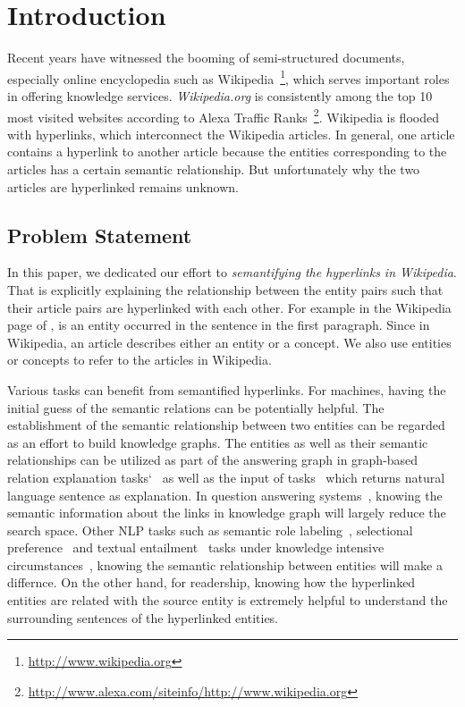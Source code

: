 \section{Introduction}
Recent years have witnessed the booming of semi-structured documents, especially online encyclopedia such as  Wikipedia~\footnote{\small\url{http://www.wikipedia.org}}, which serves important roles in offering knowledge services.
{\it Wikipedia.org} is consistently among the top 10 most visited websites according to Alexa Traffic Ranks~\footnote{\small\url{http://www.alexa.com/siteinfo/http://www.wikipedia.org}}.
Wikipedia is flooded with hyperlinks, which interconnect the Wikipedia articles.
In general, one article contains a hyperlink to another article because the entities corresponding to the articles has a certain semantic relationship.
But unfortunately why the two articles are hyperlinked remains unknown.

\subsection{Problem Statement}
In this paper, we dedicated our effort to {\it semantifying the hyperlinks in Wikipedia}.
That is explicitly explaining the relationship between the entity pairs such that their article pairs are hyperlinked with each other. 
For example in the Wikipedia page of ,  is an entity occurred in the sentence  in the first paragraph.
Since in Wikipedia, an article describes either an entity or a concept. We also use entities or concepts to refer to the articles in Wikipedia. 

Various tasks can benefit from semantified hyperlinks.
For machines, having the initial guess of the semantic relations can be potentially helpful.
The establishment of the semantic relationship between two entities can be regarded as an effort to build knowledge graphs.
The entities as well as their semantic relationships can be utilized as part of the answering graph in graph-based relation explanation tasks`~\cite{fang2011rex} as well as the input of tasks~\cite{voskarideslearning} which returns natural language sentence as explanation.
In question answering systems~\cite{yang2014slq}, knowing the semantic information about the links in knowledge graph will largely reduce the search space.
Other NLP tasks such as semantic role labeling~\cite{palmer2010semantic}, selectional preference~\cite{pantel2007isp} and textual entailment~\cite{androutsopoulos2010survey} tasks under knowledge intensive circumstances~\cite{yao2012unsupervised,exner2011using}, knowing the semantic relationship between entities will make a differnce.
On the other hand, for readership, knowing how the hyperlinked entities are related with the source entity is extremely helpful to understand the surrounding sentences of the hyperlinked entities.

